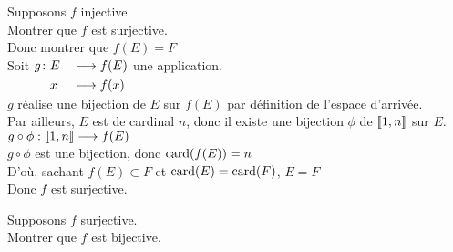 \documentclass[12pt,twoside,a4paper]{article}
\begin{document}
	\begin{preuve}
		\begin{liste}
			\item[\cercle1]Supposons $f$ injective.\\
				Montrer que $f$ est surjective.\\
				Donc montrer que $f(E)=F$\\
				Soit $\begin{aligned}[t]g\colon&E&&\longrightarrow f(E) \\&x&&\longmapsto f(x)\end{aligned}$ une application.\\
				$g$ réalise une bijection de $E$ sur $f(E)$ par définition de l'espace d'arrivée.\\
				Par ailleurs, $E$ est de cardinal $n$, donc il existe une bijection $\phi$ de $[\![ 1,n]\!]$ sur $E$.\\
				$g\circ \phi:[\![ 1,n]\!]\longrightarrow f(E)$\\
				$g\circ\phi$ est une bijection, donc $\text{card}(f(E))=n$\\
				D'o\`u, sachant $f(E)\subset F$ et $\text{card}(E)=\text{card}(F)$, $E=F$\\
				Donc $f$ est surjective.
			\item[\cercle2]Supposons $f$ surjective.\\
				Montrer que $f$ est bijective.\\
				
		\end{liste}
	\end{preuve}
\end{document}
